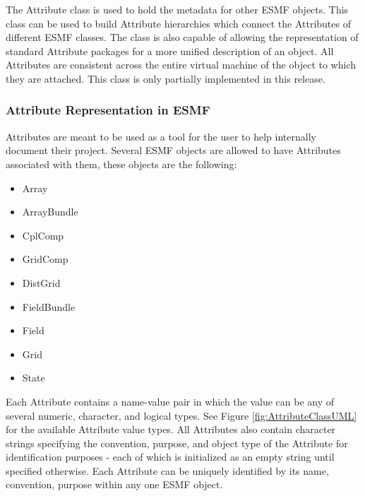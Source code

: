%

The Attribute class is used to hold the metadata for other ESMF objects.  This class can be used to build Attribute hierarchies which connect the Attributes of different ESMF classes.  The class is also capable of allowing the representation of standard Attribute packages for a more unified description of an object.  All Attributes are consistent across the entire virtual machine of the object to which they are attached.  This class is only partially implemented in this release.

\subsubsection{Attribute Representation in ESMF}

Attributes are meant to be used as a tool for the user to help internally document their project.   Several ESMF objects are allowed to have Attributes associated with them, these objects are the following:

\begin{itemize}
\item Array
\item ArrayBundle
\item CplComp
\item GridComp
\item DistGrid
\item FieldBundle
\item Field
\item Grid
\item State
\end{itemize}

Each Attribute contains a name-value pair in which the value can be any of several numeric, character, and logical types.  See Figure \ref{fig:AttributeClassUML} for the available Attribute value types.  All Attributes also contain character strings specifying the convention, purpose, and object type of the Attribute for identification purposes - each of which is initialized as an empty string until specified otherwise.  Each Attribute can be uniquely identified by its name, convention, purpose within any one ESMF object.  

